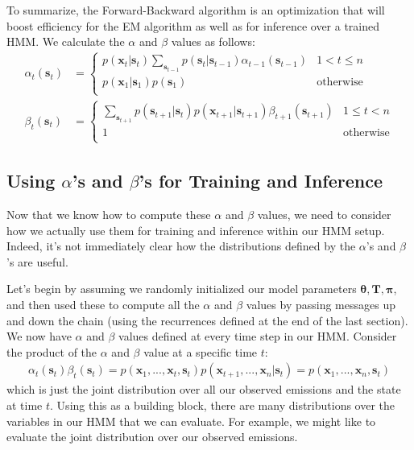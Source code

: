 To summarize, the Forward-Backward algorithm is an optimization that will boost efficiency for the EM algorithm as well as for inference over a trained HMM. We calculate the $\alpha$ and $\beta$ values as follows:
\begin{align*}
	\alpha_t(\textbf{s}_t) &=
	\begin{cases} 
      p(\textbf{x}_t | \textbf{s}_t) \sum_{\textbf{s}_{t-1}} p(\textbf{s}_t | \textbf{s}_{t-1}) \alpha_{t-1}(\textbf{s}_{t-1}) & 1 < t \leq n \\
      p(\textbf{x}_1 | \textbf{s}_{1}) p(\textbf{s}_1) & \text{otherwise} \\
   \end{cases} \\
   \beta_t(\textbf{s}_t) &=
   \begin{cases} 
      \sum_{\textbf{s}_{t+1}} p(\textbf{s}_{t+1} | \textbf{s}_t) p(\textbf{x}_{t+1} | \textbf{s}_{t+1}) \beta_{t+1}(\textbf{s}_{t+1}) & 1 \leq t < n \\
      1 & \text{otherwise} \\
   \end{cases}
\end{align*}

\subsection{Using $\alpha$'s and $\beta$'s for Training and Inference}
Now that we know how to compute these $\alpha$ and $\beta$ values, we need to consider how we actually use them for training and inference within our HMM setup. Indeed, it's not immediately clear how the distributions defined by the $\alpha$'s and $\beta$'s are useful.

Let's begin by assuming we randomly initialized our model parameters $\boldsymbol{\theta}, \textbf{T}, \boldsymbol{\pi}$, and then used these to compute all the $\alpha$ and $\beta$ values by passing messages up and down the chain (using the recurrences defined at the end of the last section). We now have $\alpha$ and $\beta$ values defined at every time step in our HMM. Consider the product of the $\alpha$ and $\beta$ value at a specific time $t$:
\begin{align*}
	\alpha_t(\textbf{s}_t) \beta_t(\textbf{s}_t) = p(\textbf{x}_1, ..., \textbf{x}_t, \textbf{s}_t) p(\textbf{x}_{t+1}, ..., \textbf{x}_n | \textbf{s}_t) = p(\textbf{x}_1, ..., \textbf{x}_n, \textbf{s}_t)
\end{align*}
which is just the joint distribution over all our observed emissions and the state at time $t$. Using this as a building block, there are many distributions over the variables in our HMM that we can evaluate. For example, we might like to evaluate the joint distribution over our observed emissions.

